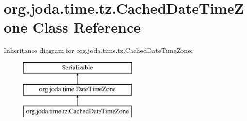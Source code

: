 \hypertarget{classorg_1_1joda_1_1time_1_1tz_1_1_cached_date_time_zone}{\section{org.\-joda.\-time.\-tz.\-Cached\-Date\-Time\-Zone Class Reference}
\label{classorg_1_1joda_1_1time_1_1tz_1_1_cached_date_time_zone}
}
Inheritance diagram for org.\-joda.\-time.\-tz.\-Cached\-Date\-Time\-Zone\-:\begin{figure}[H]
\begin{center}
\leavevmode
\includegraphics[height=3.000000cm]{classorg_1_1joda_1_1time_1_1tz_1_1_cached_date_time_zone}
\end{center}
\end{figure}
